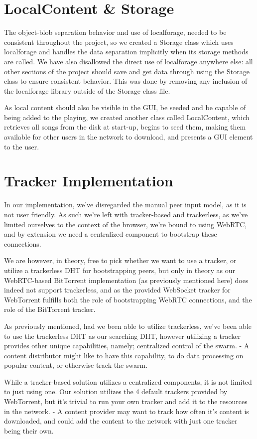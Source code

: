 \section{LocalContent \& Storage}
The object-blob separation behavior and use of localforage,
needed to be consistent throughout the project, 
so we created a Storage class which uses localforage and handles the data separation implicitly when its storage methods are called.
We have also disallowed the direct use of localforage anywhere else:
all other sections of the project should save and get data through using the Storage class to ensure consistent behavior. 
This was done by removing any inclusion of the localforage library outside of the Storage class file.

As local content should also be visible in the \acs{GUI}, 
be seeded and be capable of being added to the playing,
we created another class called LocalContent,
which retrieves all songs from the disk at start-up,
begins to seed them, making them available for other users in the network to download,
and presents a \acs{GUI} element to the user.

\section{Tracker Implementation}
In our implementation, we've disregarded the manual peer input model, as it is
not user friendly. As such we're left with tracker-based and trackerless, as 
we've limited ourselves to the context of the browser, we're bound to using 
WebRTC, and by extension we need a centralized component to bootstrap these
connections. 

We are however, in theory, free to pick whether we want to use a tracker, or 
utilize a trackerless \acs{DHT} for bootstrapping peers, but only in theory as our
WebRTC-based BitTorrent implementation (as previously mentioned here) does
indeed not support trackerless, and as the provided WebSocket tracker for 
WebTorrent fulfills both the role of bootstrapping WebRTC connections, and the
role of the BitTorrent tracker.

As previously mentioned, had we been able to utilize trackerless, we've been
able to use the trackerless \acs{DHT} as our searching \acs{DHT}, however utilizing a
tracker provides other unique capabilities, namely; centralized control of the
swarm. 
\newline
- A content distributor might like to have this capability, to do data
processing on popular content, or otherwise track the swarm.

While a tracker-based solution utilizes a centralized components, it is not
limited to just using one. Our solution utilizes the 4 default trackers
provided by WebTorrent, but it's trivial to run your own tracker and add it to
the resources in the network.
\newline
- A content provider may want to track how often it's content is downloaded,
and could add the content to the network with just one tracker being their own.
